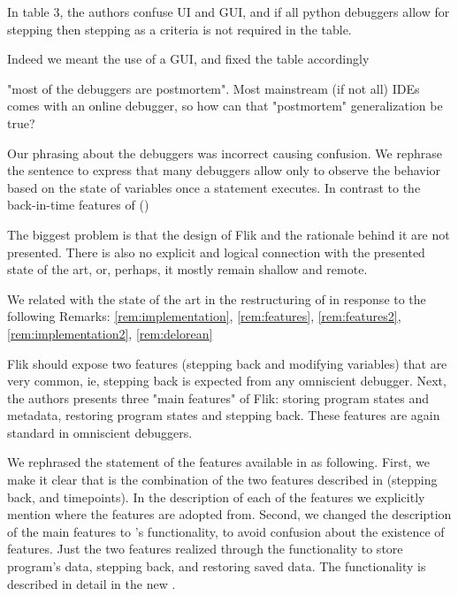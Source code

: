 \begin{remark} 
In table 3, the authors confuse UI and GUI, and if all python debuggers allow for stepping then stepping as a criteria is not required in the table.
\end{remark}
\begin{solved}
Indeed we meant the use of a GUI, and fixed the table accordingly
\end{solved}

\begin{remark}\label{rem:postmortem}
"most of the debuggers are postmortem". Most mainstream (if not all) IDEs comes with an online debugger, so how can that "postmortem" generalization be true?
\end{remark}
\begin{solved}
Our phrasing about the debuggers was incorrect causing confusion. We rephrase the sentence to express that many debuggers allow only to observe the behavior based on the state of variables once a statement executes. In contrast to the back-in-time features of \flik ()
\end{solved}

\begin{remark}\label{rem:implementation2}
The biggest problem is that the design of Flik and the rationale behind it are not presented. There is also no explicit and logical connection with the presented state of the art, or, perhaps, it mostly remain shallow and remote.
\end{remark}
\begin{solved}
We related \flik with the state of the art in the restructuring of  in response to the following Remarks: \ref{rem:implementation}, \ref{rem:features}, \ref{rem:features2}, \ref{rem:implementation2}, \ref{rem:delorean}
\end{solved}

\begin{remark} \label{rem:features}
Flik should expose two features (stepping back and modifying variables) that are very common, ie, stepping back is expected from any omniscient debugger. Next, the authors presents three "main features" of Flik: storing program states and metadata, restoring program states and stepping back. These features are again standard in omniscient debuggers.
\end{remark}
\begin{solved}
We rephrased the statement of the features available in \flik as following. First, we make it clear that \flik is the combination of the two features described in  (\ie stepping back, and timepoints). In the description of each of the features we explicitly mention where the features are adopted from. Second, we changed the description of the main features to \flik's functionality, to avoid confusion about the existence of features. Just the two features realized through the functionality to store program's data, stepping back, and restoring saved data. The functionality is described in detail in the new . 
\end{solved}

